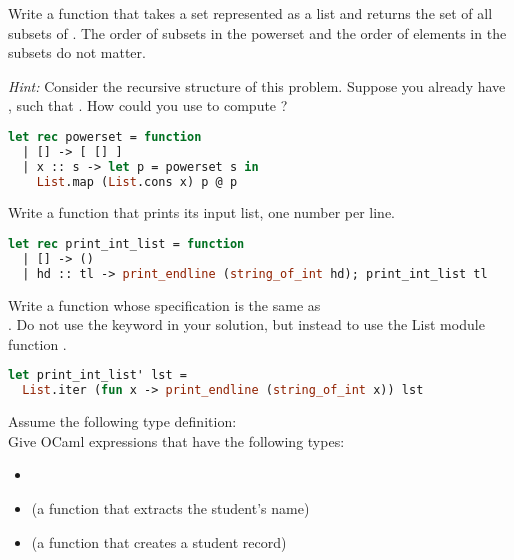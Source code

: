 \problem[powerset]
Write a function  that takes a set  represented as a list and returns the set of all subsets of . The order of subsets in the powerset and the order of elements in the subsets do not matter.

\textit{Hint:} Consider the recursive structure of this problem. Suppose you already have , such that . How could you use  to compute ?

\begin{lstlisting}[language=OCaml]
let rec powerset = function
  | [] -> [ [] ]
  | x :: s -> let p = powerset s in
    List.map (List.cons x) p @ p
\end{lstlisting}

Write a function  that prints its input list, one number per line.

\begin{lstlisting}[language=OCaml]
let rec print_int_list = function
  | [] -> ()
  | hd :: tl -> print_endline (string_of_int hd); print_int_list tl
\end{lstlisting}

Write a function  whose specification is the same as \\
. Do not use the keyword  in your solution, but instead to use the List module function .

\begin{lstlisting}[language=OCaml]
let print_int_list' lst =
  List.iter (fun x -> print_endline (string_of_int x)) lst
\end{lstlisting}

\problem[student]
Assume the following type definition:
 \\
Give OCaml expressions that have the following types:
\begin{itemize}
  \item {}
  \item {} (a function that extracts the student's name)
  \item {} (a function that creates a student record)
\end{itemize}

